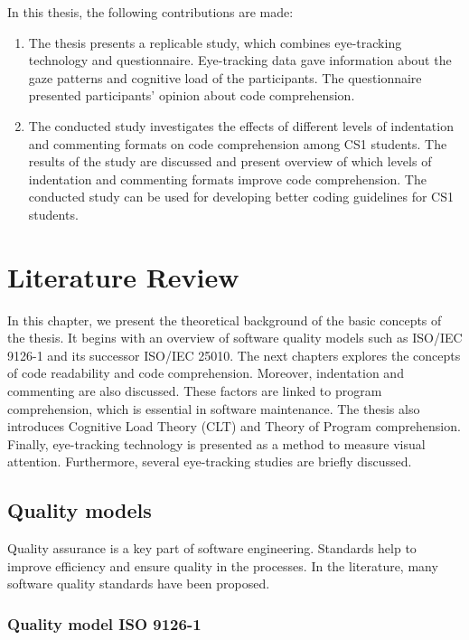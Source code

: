 In this thesis, the following contributions are made:
\begin{enumerate}

\item The thesis presents a replicable study, which combines eye-tracking technology and questionnaire. Eye-tracking data gave information about the gaze patterns and cognitive load of the participants. The questionnaire presented participants’ opinion about code comprehension.

\item  The conducted study investigates the effects of different levels of indentation and commenting formats on code comprehension among CS1 students. The results of the study are discussed and present overview of which levels of indentation and commenting formats improve code comprehension. The conducted study can be used for developing better coding guidelines for CS1 students.

\end{enumerate}

\chapter{Literature Review}
In this chapter, we present the theoretical background of the basic concepts of the thesis. It begins with an overview of software quality models such as ISO/IEC 9126-1 and its successor ISO/IEC 25010. The next chapters explores the concepts of code readability and code comprehension. Moreover, indentation and commenting are also discussed. These factors are  linked to program comprehension, which is essential in software maintenance. The thesis also introduces Cognitive Load Theory (CLT) and Theory of Program comprehension. Finally,  eye-tracking technology is presented as a method to measure visual attention. Furthermore, several eye-tracking studies are briefly discussed. 



\section{Quality models}
Quality assurance is a key part of software engineering. Standards help to improve efficiency and ensure quality in the processes. In the literature, many software quality standards have been proposed.



\subsection{Quality model ISO 9126-1}


